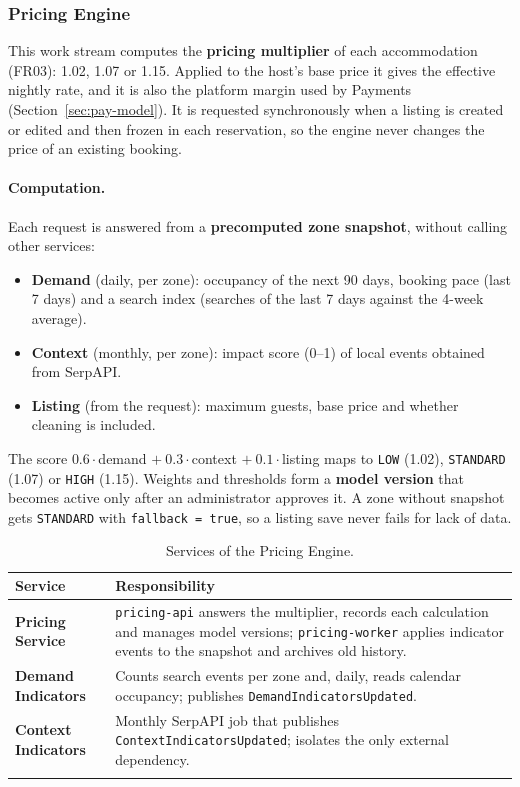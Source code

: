 \begingroup
\setlength{\emergencystretch}{3em}
\subsubsection{Pricing Engine}
\label{sec:price-style}

This work stream computes the \textbf{pricing multiplier} of each
accommodation (FR03): 1.02, 1.07 or 1.15. Applied to the host's base price it
gives the effective nightly rate, and it is also the platform margin used by
Payments (Section~\ref{sec:pay-model}). It is requested synchronously when a
listing is created or edited and then frozen in each reservation, so the
engine never changes the price of an existing booking.

\paragraph{Computation.} Each request is answered from a \textbf{precomputed
zone snapshot}, without calling other services:
\begin{itemize}
  \item \textbf{Demand} (daily, per zone): occupancy of the next 90 days,
    booking pace (last 7 days) and a search index (searches of the last 7 days
    against the 4-week average).
  \item \textbf{Context} (monthly, per zone): impact score (0--1) of local
    events obtained from SerpAPI.
  \item \textbf{Listing} (from the request): maximum guests, base price and
    whether cleaning is included.
\end{itemize}
The score $0.6\cdot$demand $+\ 0.3\cdot$context $+\ 0.1\cdot$listing maps to
\texttt{LOW} (1.02), \texttt{STANDARD} (1.07) or \texttt{HIGH} (1.15). Weights
and thresholds form a \textbf{model version} that becomes active only after an
administrator approves it. A zone without snapshot gets \texttt{STANDARD} with
\texttt{fallback = true}, so a listing save never fails for lack of data.

\begin{longtable}{@{}L{3.2cm}L{10.6cm}@{}}
\toprule
\textbf{Service} & \textbf{Responsibility} \\
\midrule
\endhead
\textbf{Pricing Service} &
  \texttt{pricing-api} answers the multiplier, records each calculation and
  manages model versions; \texttt{pricing-worker} applies indicator events to
  the snapshot and archives old history. \\
\addlinespace
\textbf{Demand Indicators} &
  Counts search events per zone and, daily, reads calendar occupancy;
  publishes \texttt{Demand\allowbreak Indicators\allowbreak Updated}. \\
\addlinespace
\textbf{Context Indicators} &
  Monthly SerpAPI job that publishes \texttt{Context\allowbreak Indicators\allowbreak Updated};
  isolates the only external dependency. \\
\bottomrule
\caption{Services of the Pricing Engine.}
\label{tab:price-services}
\end{longtable}


